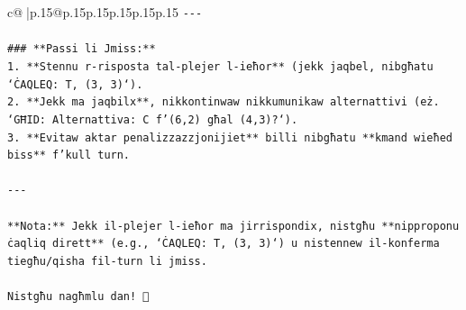 \documentclass{article}
\begin{document}
{\begin{supertabular}{c@{$\;$}|p{.15\linewidth}@{}p{.15\linewidth}p{.15\linewidth}p{.15\linewidth}p{.15\linewidth}p{.15\linewidth}}
{{{\texttt{{-}{-}{-}} \\
\\ 
\texttt{\#\#\# **Passi li Jmiss:**} \\
\texttt{1. **Stennu r{-}risposta tal{-}plejer l{-}ieħor** (jekk jaqbel, nibgħatu `ĊAQLEQ: T, (3, 3)`).} \\
\texttt{2. **Jekk ma jaqbilx**, nikkontinwaw nikkumunikaw alternattivi (eż. `GĦID: Alternattiva: C f'(6,2) għal (4,3)?`).} \\
\texttt{3. **Evitaw aktar penalizzazzjonijiet** billi nibgħatu **kmand wieħed biss** f'kull turn.} \\
\\ 
\texttt{{-}{-}{-}} \\
\\ 
\texttt{**Nota:** Jekk il{-}plejer l{-}ieħor ma jirrispondix, nistgħu **nipproponu ċaqliq dirett** (e.g., `ĊAQLEQ: T, (3, 3)`) u nistennew il{-}konferma tiegħu/qisha fil{-}turn li jmiss.} \\
\\ 
\texttt{Nistgħu nagħmlu dan! 🚀} \\
            }
        }
    }
     \\ \\


\end{supertabular}}
\end{document}
